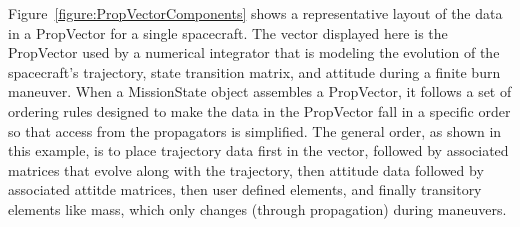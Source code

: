 
Figure~\ref{figure:PropVectorComponents} shows a representative layout of the data in a PropVector
for a single spacecraft.  The vector displayed here is the PropVector used by a numerical
integrator that is modeling the evolution of the spacecraft's trajectory, state transition matrix,
and attitude during a finite burn maneuver.  When a MissionState object assembles a PropVector, it
follows a set of ordering rules designed to make the data in the PropVector fall in a specific
order so that access from the propagators is simplified.  The general order, as shown in this
example, is to place trajectory data first in the vector, followed by associated matrices that
evolve along with the trajectory, then attitude data followed by associated attitde matrices, then
user defined elements, and finally transitory elements like mass, which only changes (through
propagation) during maneuvers.

